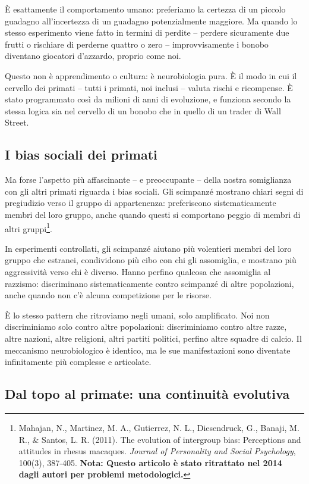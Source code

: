 È esattamente il comportamento umano: preferiamo la certezza di un piccolo guadagno all'incertezza di un guadagno potenzialmente maggiore. Ma quando lo stesso esperimento viene fatto in termini di perdite -- perdere sicuramente due frutti o rischiare di perderne quattro o zero -- improvvisamente i bonobo diventano giocatori d'azzardo, proprio come noi.

Questo non è apprendimento o cultura: è neurobiologia pura. È il modo in cui il cervello dei primati -- tutti i primati, noi inclusi -- valuta rischi e ricompense. È stato programmato così da milioni di anni di evoluzione, e funziona secondo la stessa logica sia nel cervello di un bonobo che in quello di un trader di Wall Street.

\subsection{I bias sociali dei primati}

Ma forse l'aspetto più affascinante -- e preoccupante -- della nostra somiglianza con gli altri primati riguarda i bias sociali. Gli scimpanzé mostrano chiari segni di pregiudizio verso il gruppo di appartenenza: preferiscono sistematicamente membri del loro gruppo, anche quando questi si comportano peggio di membri di altri gruppi\footnote{Mahajan, N., Martinez, M. A., Gutierrez, N. L., Diesendruck, G., Banaji, M. R., \& Santos, L. R. (2011). The evolution of intergroup bias: Perceptions and attitudes in rhesus macaques. \emph{Journal of Personality and Social Psychology}, 100(3), 387-405. \textbf{Nota: Questo articolo è stato ritrattato nel 2014 dagli autori per problemi metodologici.}}.

In esperimenti controllati, gli scimpanzé aiutano più volentieri membri del loro gruppo che estranei, condividono più cibo con chi gli assomiglia, e mostrano più aggressività verso chi è diverso. Hanno perfino qualcosa che assomiglia al razzismo: discriminano sistematicamente contro scimpanzé di altre popolazioni, anche quando non c'è alcuna competizione per le risorse.

È lo stesso pattern che ritroviamo negli umani, solo amplificato. Noi non discriminiamo solo contro altre popolazioni: discriminiamo contro altre razze, altre nazioni, altre religioni, altri partiti politici, perfino altre squadre di calcio. Il meccanismo neurobiologico è identico, ma le sue manifestazioni sono diventate infinitamente più complesse e articolate.

\subsection{Dal topo al primate: una continuità evolutiva}

